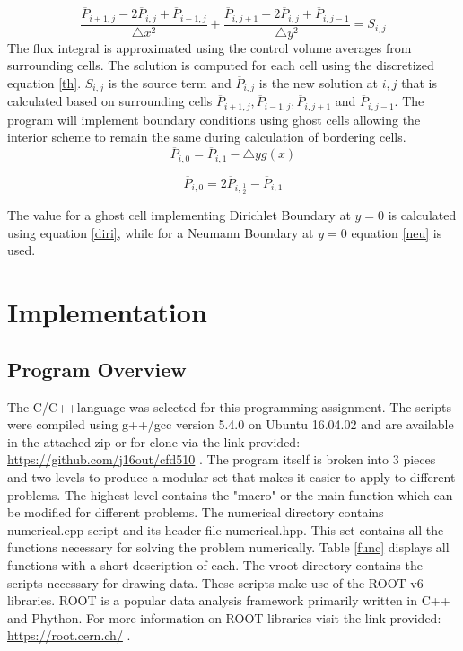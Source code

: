 \documentclass[paper=a4, fontsize=11pt, abstract=on]{scrartcl}
\numberwithin{equation}{section}		%
\numberwithin{figure}{section}			%
\numberwithin{table}{section}				%
\begin{document}
 \begin{equation}
\label{th}
\frac{\overline{P}_{i+1,j}-2\overline{P}_{i,j}+\overline{P}_{i-1,j} }{\triangle x^2} +\frac{\overline{P}_{i,j+1}-2\overline{P}_{i,j}+\overline{P}_{i,j-1} }{\triangle y^2} = S_{i,j}
\end{equation}
The flux integral is approximated using the control volume averages from surrounding cells. The solution is computed for each cell using the discretized equation \ref{th}.  
$S_{i,j}$ is the source term and $\overline{P}_{i,j}$ is the new solution at $i,j$ that is calculated based on surrounding cells $\overline{P}_{i+1,j}, \overline{P}_{i-1,j}, \overline{P}_{i,j+1}$ and $\overline{P}_{i,j-1}$. The program will implement boundary conditions using ghost cells allowing the interior scheme to remain the same during calculation of bordering cells. 
\begin{equation}
\label{diri}
\overline{P}_{i,0} = \overline{P}_{i,1}-\triangle y g(x)
\end{equation}

\begin{equation}
\label{neu}
\overline{P}_{i,0} = 2\overline{P}_{i,\frac{1}{2}}-\overline{P}_{i,1} 
\end{equation} 

The value for a ghost cell implementing Dirichlet Boundary at $y=0$ is calculated using equation \ref{diri}, while for a Neumann Boundary at $y=0$ equation \ref{neu} is used.
 


\section{Implementation}
\subsection{Program Overview}
The C/C++language was selected for this programming assignment. The scripts were compiled using g++/gcc version 5.4.0 on Ubuntu 16.04.02 and are available in the attached zip or for clone via the link provided: \url{https://github.com/j16out/cfd510} . The program itself is broken into 3 pieces and two levels to produce a modular set that makes it easier to apply to different problems. The highest level contains the "macro" or the main function which can be modified for different problems. The numerical directory contains numerical.cpp script and its header file numerical.hpp. This set contains all the functions necessary for solving the problem numerically. Table \ref{func} displays all functions with a short description of each. The vroot directory contains the scripts necessary for drawing data. These scripts make use of the ROOT-v6 libraries. ROOT is a popular data analysis framework primarily written in C++ and Phython. For more information on ROOT libraries visit the link provided: \url{https://root.cern.ch/} .
\end{document}
